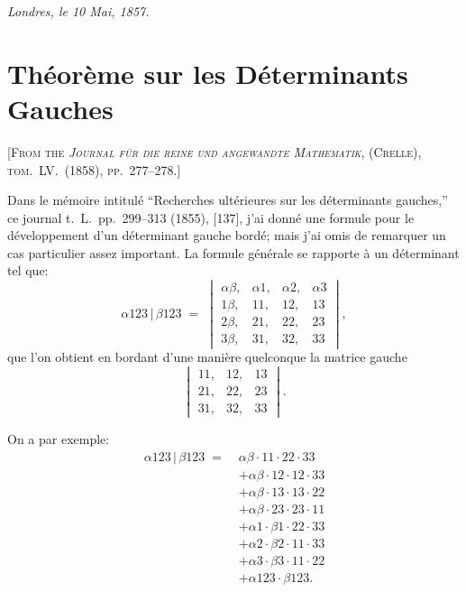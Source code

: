 \documentclass[11pt,a4paper]{article}
\begin{document}
\medskip
\noindent\textit{Londres, le 10 Mai, 1857.}

\newpage


\setcounter{page}{72}

\section*{Th\'eor\`eme sur les D\'eterminants Gauches}
\label{paper:237}

\textsc{[From the \textit{Journal f\"ur die reine und angewandte Mathematik}, (Crelle), tom.~LV.\ (1858), pp.~277--278.]}

\medskip

Dans le m\'emoire intitul\'e ``Recherches ult\'erieures sur les d\'eterminants
gauches,'' ce journal t.~L.\ pp.~299--313 (1855), [137], j'ai donn\'e une formule
pour le d\'eveloppement d'un d\'eterminant gauche bord\'e; mais j'ai omis de
remarquer un cas particulier assez important. La formule g\'en\'erale se rapporte
\`a un d\'eterminant tel que:
\[
\alpha123\,|\,\beta123 \;=\;
\begin{vmatrix}
\alpha\beta, & \alpha1, & \alpha2, & \alpha3 \\
1\beta, & 11, & 12, & 13 \\
2\beta, & 21, & 22, & 23 \\
3\beta, & 31, & 32, & 33
\end{vmatrix},
\]
que l'on obtient en bordant d'une mani\`ere quelconque la matrice gauche
\[
\begin{vmatrix}
11, & 12, & 13 \\
21, & 22, & 23 \\
31, & 32, & 33
\end{vmatrix}.
\]

On a par exemple:
\begin{align*}
\alpha123\,|\,\beta123 \;=\;
&\alpha\beta \cdot 11\cdot 22\cdot 33 \\
&+ \alpha\beta \cdot 12\cdot 12\cdot 33 \\
&+ \alpha\beta \cdot 13\cdot 13\cdot 22 \\
&+ \alpha\beta \cdot 23\cdot 23\cdot 11 \\
&+ \alpha1 \cdot \beta1 \cdot 22\cdot 33 \\
&+ \alpha2 \cdot \beta2 \cdot 11\cdot 33 \\
&+ \alpha3 \cdot \beta3 \cdot 11\cdot 22 \\
&+ \alpha123 \cdot \beta123.
\end{align*}
\end{document}

